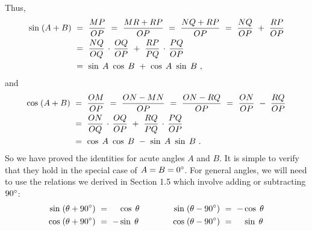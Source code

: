 \noindent Thus,
\begin{align}
 \sin\;(A+B) ~&=~ \frac{MP}{OP} ~=~ \frac{MR+RP}{OP} ~=~ \frac{NQ+RP}{OP} ~=~
  \frac{NQ}{OP} ~+~ \frac{RP}{OP}\notag\\
 &=~ \frac{NQ}{OQ}\,\cdot\,\frac{OQ}{OP} ~+~ \frac{RP}{PQ}\,\cdot\,\frac{PQ}{OP}\notag\\
 &=~ \sin\;A ~ \cos\;B ~+~ \cos\;A ~ \sin\;B ~,\label{eqn:sinsumproof}
\end{align}
and
\begin{align}
 \cos\;(A+B) ~&=~ \frac{OM}{OP} ~=~ \frac{ON-MN}{OP} ~=~ \frac{ON-RQ}{OP} ~=~
  \frac{ON}{OP} ~-~ \frac{RQ}{OP}\notag\\
 &=~ \frac{ON}{OQ}\,\cdot\,\frac{OQ}{OP} ~+~ \frac{RQ}{PQ}\,\cdot\,\frac{PQ}{OP}\notag\\
 &=~ \cos\;A ~ \cos\;B ~-~ \sin\;A ~ \sin\;B ~.\label{eqn:cossumproof}
\end{align}
So we have proved the identities for acute angles $A$ and $B$. It is simple
to verify that they hold in the special case of $A=B=0^\circ$. For general
angles, we will need to use the relations we derived in Section 1.5 which involve adding or
subtracting $90^\circ$:
\begin{alignat*}{4}
 \sin\;(\theta + 90^\circ) ~ &= ~ \phantom{-}\cos\;\theta &\qquad\quad
 \sin\;(\theta - 90^\circ) ~ &= ~ -\cos\;\theta\\
 \cos\;(\theta + 90^\circ) ~ &= ~ -\sin\;\theta &\qquad\quad
 \cos\;(\theta - 90^\circ) ~ &= ~ \phantom{-}\sin\;\theta
\end{alignat*}

